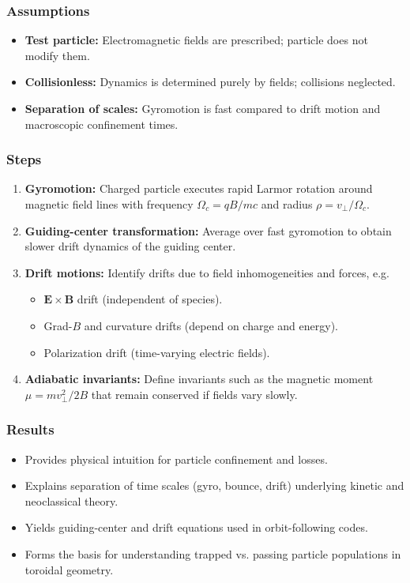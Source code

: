 \documentclass[10pt]{book}
\begin{document}
\subsubsection{Assumptions}
\begin{itemize}
    \item \textbf{Test particle:} Electromagnetic fields are prescribed; particle does not modify them.
    \item \textbf{Collisionless:} Dynamics is determined purely by fields; collisions neglected.
    \item \textbf{Separation of scales:} Gyromotion is fast compared to drift motion and macroscopic confinement times.
\end{itemize}

\subsubsection{Steps}
\begin{enumerate}
    \item \textbf{Gyromotion:} Charged particle executes rapid Larmor rotation around magnetic field lines with frequency $\Omega_c = q B / m c$ and radius $\rho = v_\perp / \Omega_c$.
    \item \textbf{Guiding-center transformation:} Average over fast gyromotion to obtain slower drift dynamics of the guiding center.
    \item \textbf{Drift motions:} Identify drifts due to field inhomogeneities and forces, e.g.
    \begin{itemize}
        \item $\mathbf{E}\times\mathbf{B}$ drift (independent of species).
        \item Grad-$B$ and curvature drifts (depend on charge and energy).
        \item Polarization drift (time-varying electric fields).
    \end{itemize}
    \item \textbf{Adiabatic invariants:} Define invariants such as the magnetic moment $\mu = m v_\perp^2 / 2B$ that remain conserved if fields vary slowly.
\end{enumerate}

\subsubsection{Results}
\begin{itemize}
    \item Provides physical intuition for particle confinement and losses.
    \item Explains separation of time scales (gyro, bounce, drift) underlying kinetic and neoclassical theory.
    \item Yields guiding-center and drift equations used in orbit-following codes.
    \item Forms the basis for understanding trapped vs. passing particle populations in toroidal geometry.
\end{itemize}
\end{document}
